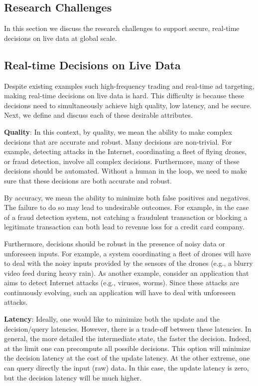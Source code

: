 \subsection{Research Challenges }

In this section we discuss the research challenges to support secure, real-time decisions on live data at global scale.


\subsection{Real-time Decisions on Live Data} 

Despite existing examples such high-frequency trading and real-time ad targeting, making real-time decisions on live data is hard. This difficulty is because these decisions need to simultaneously achieve high quality, low latency, and be secure. Next, we define and discuss each of these desirable attributes.

{\bf Quality}: In this context, by quality, we mean the ability to make complex decisions that are accurate and robust. Many decisions are non-trivial. For example, detecting attacks in the Internet, coordinating a fleet of flying drones, or fraud detection, involve all complex decisions. Furthermore, many of these decisions should be automated. Without a human in the loop, we need to make sure that these decisions are both accurate and robust. 

By accuracy, we mean the ability to minimize both false positives and negatives. The failure to do so may lead to undesirable outcomes. For example, in the case of a fraud detection system, not catching a fraudulent transaction or blocking a legitimate transaction can both lead to revenue loss for a credit card company. 

Furthermore, decisions should be robust in the presence of noisy data or unforeseen inputs. For example, a system coordinating a fleet of drones will have to deal with the noisy inputs provided by the sensors of the drones (e.g., a blurry video feed during heavy rain). As another example, consider an application that aims to detect Internet attacks (e.g., viruses, worms). Since these attacks are continuously evolving, such an application will have to deal with unforeseen attacks.

{\bf Latency}: Ideally, one would like to minimize both the update and the decision/query latencies. However, there is a trade-off between these latencies. In general, the more detailed the intermediate state, the faster the decision. Indeed, at the limit one can precompute all possible decisions. This option will minimize the decision latency at the cost of the update latency. At the other extreme, one can query directly the input (raw) data. In this case, the update latency is zero, but the decision latency will be much higher. 

